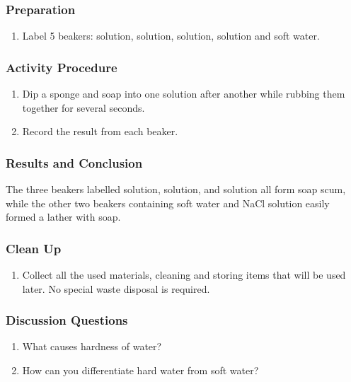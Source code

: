\subsubsection*{Preparation}
\begin{enumerate}
\item{Label 5 beakers:  solution,  solution,  solution,  solution and soft water.}
\end{enumerate}

\subsubsection*{Activity Procedure}
\begin{enumerate}
\item{Dip a sponge and soap into one solution after another while rubbing them together for several seconds.}
\item{Record the result from each beaker.}
\end{enumerate}

\subsubsection*{Results and Conclusion}
The three beakers labelled  solution,  solution, and   solution all form soap scum, while the other two beakers containing soft water and NaCl solution easily formed a lather with soap.

\subsubsection*{Clean Up}
\begin{enumerate}
\item{Collect all the used materials, cleaning and storing items that will be used later. No special waste disposal is required.}
\end{enumerate}

\subsubsection*{Discussion Questions}
\begin{enumerate}
\item{What causes hardness of water?}
\item{How can you differentiate hard water from soft water?}
\end{enumerate}


